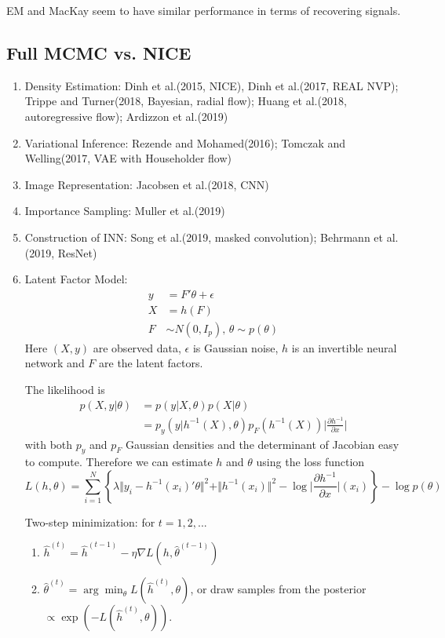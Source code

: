 \documentclass[11pt]{article}%
\begin{document}
EM and MacKay seem to have similar performance in terms of recovering signals.

\subsection{Full MCMC vs. NICE}

\begin{enumerate}
	\item Density Estimation: Dinh et al.(2015, NICE), Dinh et al.(2017, REAL NVP); Trippe and Turner(2018, Bayesian, radial flow); Huang et al.(2018, autoregressive flow); Ardizzon et al.(2019)
	\item Variational Inference: Rezende and Mohamed(2016); Tomczak and Welling(2017, VAE with Householder flow)
	\item Image Representation: Jacobsen et al.(2018, CNN)
	\item Importance Sampling: Muller et al.(2019)
	\item Construction of INN: Song et al.(2019, masked convolution); Behrmann et al.(2019, ResNet)	
	\item Latent Factor Model: \begin{align}
		y &= F'\theta + \epsilon\\
		X &= h(F)\\
		F &\sim N(0, I_p),\, \theta \sim p(\theta)
	\end{align}
	Here $(X, y)$ are observed data, $\epsilon$ is Gaussian noise,  $h$ is an invertible neural network and $F$ are the latent factors. 
	
	The likelihood is 
	\begin{align*}
		p(X, y | \theta) &= p(y | X, \theta)p(X|\theta)\\
		&= p_y(y | h^{-1}(X), \theta) p_F(h^{-1}(X)) \Big | \frac{\partial h^{-1}}{\partial x}\Big | 
	\end{align*}
	with both $p_y$ and $p_F$ Gaussian densities and the determinant of Jacobian easy to compute. Therefore we can estimate $h$ and $\theta$ using the loss function 
	$$
	L(h, \theta) = \sum_{i=1}^N \left\{\lambda \Vert y_i - h^{-1}(x_i)'\theta\Vert^2 +  \Vert h^{-1}(x_i) \Vert^2 - \log \Big | \frac{\partial h^{-1}}{\partial x}\Big |(x_i) \right\} - \log p(\theta)
	$$
	
	Two-step minimization: for $t=1,2,...$
	\begin{enumerate}
		\item $\hat h^{(t)} = \hat h^{(t-1)} - \eta \nabla L(h, \hat\theta^{(t-1)})$
		\item $\hat \theta^{(t)} = \arg\min_\theta L(\hat h^{(t)}, \theta)$, or draw samples from the posterior $\propto \exp\left(-L(\hat h^{(t)}, \theta)\right)$.
	\end{enumerate}
	

\end{enumerate}
\end{document}
